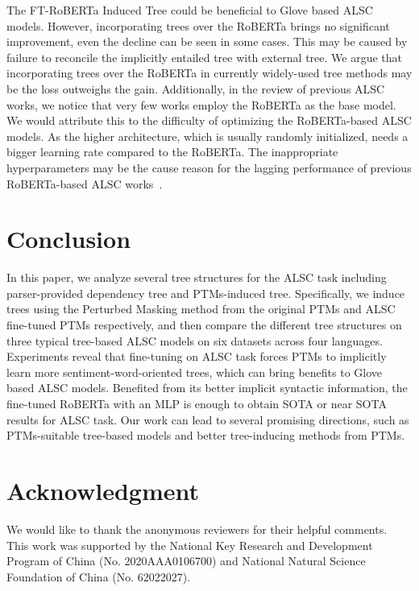 \documentclass[11pt]{article}
\begin{document}
The FT-RoBERTa Induced Tree could be beneficial to Glove based ALSC models. However, incorporating trees over the RoBERTa brings no significant improvement, even the decline can be seen in some cases. This may be caused by failure to reconcile  the implicitly entailed tree with external tree. We argue that incorporating trees over the RoBERTa in currently widely-used tree methods    may be the loss outweighs the gain.
Additionally, in the review of previous ALSC works, we notice that very few works employ the RoBERTa as the base model. We would attribute this to the difficulty of  optimizing the RoBERTa-based ALSC models. As the higher architecture, which is usually randomly initialized, needs a bigger learning rate compared to the RoBERTa. The  inappropriate hyperparameters may be  the cause reason for the lagging performance of previous RoBERTa-based ALSC works~\citep{DBLP:conf/acl/PhanO20}.



\section{Conclusion}
In this paper, we analyze several tree structures for the ALSC task including parser-provided dependency tree and PTMs-induced tree. Specifically, we induce trees  using the Perturbed Masking method from the original PTMs and ALSC fine-tuned PTMs respectively, and then compare the different tree structures on three typical tree-based ALSC models on six datasets across four languages.  Experiments reveal that fine-tuning on ALSC task forces PTMs to implicitly learn more sentiment-word-oriented trees, which can bring  benefits to Glove based ALSC models. Benefited from its better implicit syntactic information, the fine-tuned RoBERTa with an MLP is enough to obtain SOTA or near SOTA results for ALSC task.
Our work can lead to  several promising directions, such as PTMs-suitable tree-based models and better tree-inducing methods from PTMs.


\section*{Acknowledgment}
We would like to thank the anonymous reviewers for their helpful comments. This work was supported by the National Key Research and Development Program of China (No. 2020AAA0106700) and  National Natural Science Foundation of China (No. 62022027).
\end{document}
